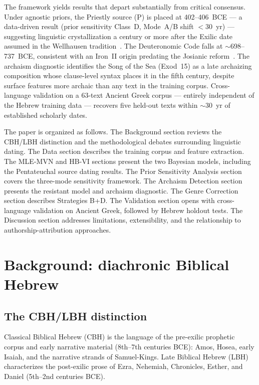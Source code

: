 \documentclass[10pt,letterpaper]{article}
\newcommand{\cbh}{CBH}
\newcommand{\lbh}{LBH}
\begin{document}
The framework yields results that depart substantially from critical
consensus.  Under agnostic priors, the Priestly source (P) is placed at
402--406~BCE --- a data-driven result (prior sensitivity Class~D,
Mode~A/B shift ${<}30$~yr) --- suggesting linguistic crystallization a
century or more after the Exilic date assumed in the Wellhausen
tradition~\cite{Wellhausen1885,CarrFormation2011}.  The
Deuteronomic Code falls at $\sim$698--737~BCE, consistent with an
Iron~II origin predating the Josianic reform~\cite{Romer2005}.  The archaism diagnostic
identifies the Song of the Sea (Exod~15) as a late archaizing composition
whose clause-level syntax places it in the fifth century, despite surface
features more archaic than any text in the training corpus.
Cross-language validation on a 63-text Ancient Greek corpus --- entirely
independent of the Hebrew training data --- recovers five held-out texts
within $\sim$30~yr of established scholarly dates.

The paper is organized as follows.  The Background section reviews the
CBH/LBH distinction and the methodological debates surrounding linguistic
dating.  The Data section describes the training corpus and feature
extraction.  The MLE-MVN and HB-VI sections present the two Bayesian
models, including the Pentateuchal source dating results.  The Prior
Sensitivity Analysis section covers the three-mode sensitivity framework.
The Archaism Detection section presents the resistant model and archaism
diagnostic.  The Genre Correction section describes Strategies B+D.
The Validation section opens with cross-language validation on Ancient
Greek, followed by Hebrew holdout tests.  The Discussion section
addresses limitations, extensibility, and the relationship to
authorship-attribution approaches.

\section*{Background: diachronic Biblical Hebrew}

\subsection*{The CBH/LBH distinction}

Classical Biblical Hebrew (\cbh{}) is the language of the pre-exilic
prophetic corpus and early narrative material (8th--7th centuries BCE):
Amos, Hosea, early Isaiah, and the narrative strands of Samuel-Kings.
Late Biblical Hebrew (\lbh{}) characterizes the post-exilic prose of
Ezra, Nehemiah, Chronicles, Esther, and Daniel (5th--2nd centuries BCE).
\end{document}
